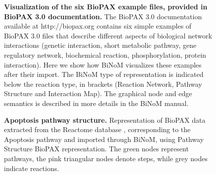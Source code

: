 \documentclass[10pt]{bmc_article}
\newenvironment{bmcformat}{\baselineskip20pt\sloppy\setboolean{publ}{false}}{\baselineskip20pt\sloppy}
\begin{document}
\begin{bmcformat}
\begin{figure}[h] \caption{\label{6biopax3_examples}  \textbf{Visualization of
the six BioPAX example files, provided in BioPAX 3.0 documentation.} The BioPAX
3.0 documentation available at http://biopax.org contains six simple examples
of BioPAX 3.0 files that describe different aspects of biological network
interactions (genetic interaction, short metabolic pathway, gene regulatory
network, biochemical reaction, phosphorylation, protein interaction). Here we
show how BiNoM visualizes these examples after their import. The BiNoM type of
representation is indicated below the reaction type, in brackets (Reaction
Network, Pathway Structure and Interaction Map). The graphical node and edge
semantics is described in more details in the BiNoM manual.}
\end{figure}

\begin{figure}[h]
 \caption{\label{apoptosishierarchical}  \textbf{Apoptosis pathway 
structure.} Representation of BioPAX data extracted from the Reactome database
\cite{joshi2005reactome}, corresponding to the Apoptosis pathway and imported through
BiNoM, using Pathway Structure BioPAX representation. The green nodes represent pathways, the pink
triangular nodes denote steps, while grey nodes indicate reactions.}
\end{figure}



\end{bmcformat}
\end{document}
